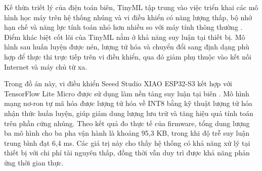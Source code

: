 Kế thừa triết lý của điện toán biên, TinyML tập trung vào việc triển khai các mô hình học máy trên hệ thống nhúng và vi điều khiển có năng lượng thấp, bộ nhớ hạn chế và năng lực tính toán nhỏ hơn nhiều so với máy tính thông thường \cite{ref_1_1,ref_1_7}. Điểm khác biệt cốt lõi của TinyML nằm ở khả năng suy luận tại thiết bị. Mô hình sau huấn luyện được nén, lượng tử hóa và chuyển đổi sang định dạng phù hợp để thực thi trực tiếp trên vi điều khiển, qua đó giảm phụ thuộc vào kết nối Internet và máy chủ từ xa.

Trong đồ án này, vi điều khiển Seeed Studio XIAO ESP32-S3 kết hợp với TensorFlow Lite Micro được sử dụng làm nền tảng suy luận tại biên . Mô hình mạng nơ-ron tự mã hóa được lượng tử hóa về INT8 bằng kỹ thuật lượng tử hóa nhận thức huấn luyện, giúp giảm dung lượng lưu trữ và tăng hiệu quả tính toán trên phần cứng nhúng. Theo kết quả đo thực tế của firmware, tổng dung lượng ba mô hình cho ba pha vận hành là khoảng 95,3 KB, trong khi độ trễ suy luận trung bình đạt 6,4 ms. Các giá trị này cho thấy hệ thống có khả năng xử lý tại thiết bị với chi phí tài nguyên thấp, đồng thời vẫn duy trì được khả năng phản ứng thời gian thực.
